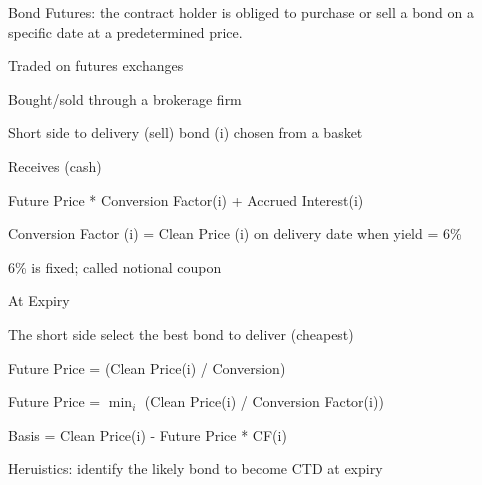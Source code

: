 \documentclass[12pt]{article}
\begin{document}
Bond Futures: the contract holder is obliged to purchase or sell a bond on a specific date at a predetermined price. 

Traded on futures exchanges

Bought/sold through a brokerage firm

Short side to delivery (sell) bond (i) chosen from a basket

Receives (cash)

Future Price * Conversion Factor(i) + Accrued Interest(i)

Conversion Factor (i) = Clean Price (i) on delivery date when yield = 6\%

6\% is fixed; called notional coupon


At Expiry

The short side select the best bond to deliver (cheapest)

Future Price = (Clean Price(i) / Conversion)

Future Price = $\min_i$ (Clean Price(i) / Conversion Factor(i))

Basis = Clean Price(i) - Future Price * CF(i)



Heruistics: identify the likely bond to become CTD at expiry
\end{document}
